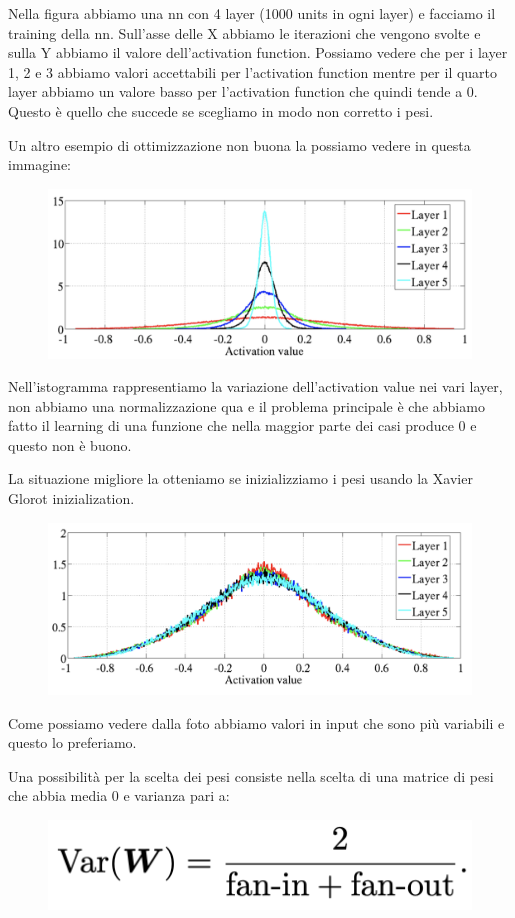\documentclass[14pt]{extreport}
\begin{document}
Nella figura abbiamo una nn con 4 layer (1000 units in ogni layer) e facciamo il training della nn. Sull'asse delle X abbiamo le iterazioni che
vengono svolte e sulla Y abbiamo il valore dell'activation function. Possiamo vedere che per i layer 1, 2 e 3 abbiamo valori accettabili per
l'activation function mentre per il quarto layer abbiamo un valore basso per l'activation function che quindi tende a 0. Questo è quello che succede
se scegliamo in modo non corretto i pesi.

Un altro esempio di ottimizzazione non buona la possiamo vedere in questa immagine:
\begin{figure}[H]
	\centering
	\includegraphics[width=0.7\linewidth]{424.jpeg}
\end{figure}

Nell'istogramma rappresentiamo la variazione dell'activation value nei vari layer, non abbiamo una normalizzazione qua e il problema principale è che
abbiamo fatto il learning di una funzione che nella maggior parte dei casi produce 0 e questo non è buono.

La situazione migliore la otteniamo se inizializziamo i pesi usando la Xavier Glorot inizialization.
\begin{figure}[H]
	\centering
	\includegraphics[width=0.7\linewidth]{425.jpeg}
\end{figure}
Come possiamo vedere dalla foto abbiamo valori in input che sono più variabili e questo lo preferiamo.

Una possibilità per la scelta dei pesi consiste nella scelta di una matrice di pesi che abbia media 0 e varianza pari a:

\begin{figure}[H]
	\centering
	\includegraphics[width=0.7\linewidth]{427.jpeg}
\end{figure}
\end{document}
